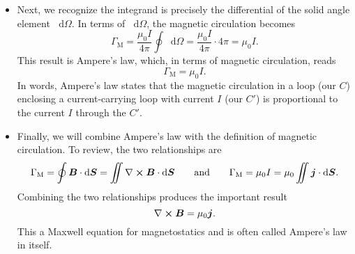 \documentclass[11pt, a4paper]{article}
\newcommand{\diff}{\mathop{}\!\mathrm{d}} %
\newcommand{\eqtext}[1]{\qquad \text{#1} \qquad}
\renewcommand{\vec}[1]{\bm{#1}} %
\newcommand{\B}{\vec{B}} %
\newcommand{\mm}{\mu_{0}}  %
\renewcommand{\j}{\vec{j}}  %
\renewcommand{\curl}{\nabla \cross}
\begin{document}
\begin{itemize}
    \item Next, we recognize the integrand is precisely the differential of the solid angle element $ \diff \Omega $. In terms of $ \diff \Omega $, the magnetic circulation becomes
	\begin{equation*}
		\Gamma_{\text{M}} = \frac{\mm I}{4\pi} \oint \diff \Omega =  \frac{\mm I}{4\pi}  \cdot 4 \pi = \mm I.
	\end{equation*}
	This result is Ampere's law, which, in terms of magnetic circulation, reads
	\begin{equation*}
		\Gamma_{\text{M}} = \mm I.
	\end{equation*}
    In words, Ampere's law states that the magnetic circulation in a loop (our $ C $) enclosing a current-carrying loop with current $ I $ (our $ C' $) is proportional to the current $ I $ through the $ C' $.
	
	\item Finally, we will combine Ampere's law with the definition of magnetic circulation. To review, the two relationships are
	\begin{equation*}
		\Gamma_{\text{M}} = \oint \B \cdot \diff \vec{S} = \iint \curl \B \cdot \diff \vec{S} \eqtext{and} \Gamma_{\text{M}} = \mm I = \mm \iint \j \cdot \diff \vec{S}.
	\end{equation*}
    Combining the two relationships produces the important result
	\begin{equation*}
		\curl \B = \mm \j.
	\end{equation*}
	This a Maxwell equation for magnetostatics and is often called Ampere's law in itself.
	
\end{itemize}
\end{document}
